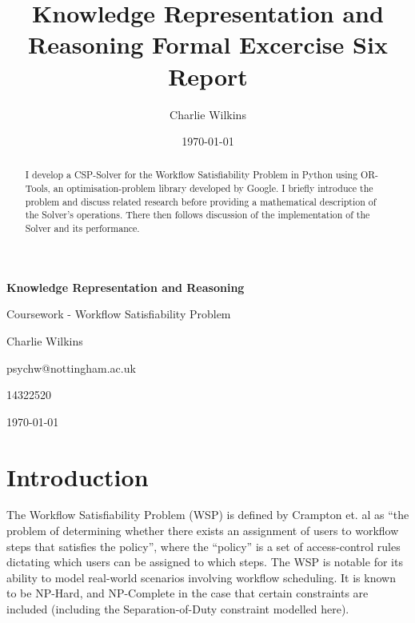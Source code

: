 \documentclass[11pt]{article}
\title{Knowledge Representation and Reasoning Formal Excercise Six Report}
\author{Charlie Wilkins}
\date{\today}
\begin{document}
	\begin{titlepage}
		\begin{center}
			\vspace*{1cm}

       		\textbf{Knowledge Representation and Reasoning}

       		\vspace{0.5cm}

			   Coursework - Workflow Satisfiability Problem

       		\vspace{1.5cm}

       		Charlie Wilkins
			
			\vspace{0.5cm}			
			
       		psychw@nottingham.ac.uk
       		
       		14322520
       		
       		\vspace{0.5cm}
       		
       		\today
		\end{center}
	\end{titlepage}

	\begin{abstract}

		I develop a CSP-Solver for the Workflow Satisfiability Problem in Python
		using OR-Tools, an optimisation-problem library developed by Google. I
		briefly introduce the problem and discuss related research before providing
		a mathematical description of the Solver's operations. There then follows
		discussion of the implementation of the Solver and its performance.

	\end{abstract}

	\newpage

	\tableofcontents

	\newpage

	\section{Introduction}

		The Workflow Satisfiability Problem (WSP) is defined by Crampton et. al\cite{crampton16} as
		``the problem of determining whether there exists an assignment of
		users to workflow steps that satisfies the policy'', where the ``policy''
		is a set of access-control rules dictating which users can be assigned
		to which steps. The WSP is notable for its ability to model real-world
		scenarios involving workflow scheduling\cite{crampton16}. It is known to be NP-Hard\cite{crampton162}, and NP-Complete in the case that
		certain constraints are included (including the Separation-of-Duty constraint
		modelled here)\cite{wang10}.
\end{document}
